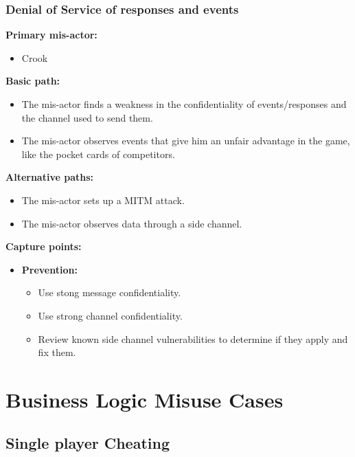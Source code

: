 \documentclass[a4paper,11pt]{report}
\begin{document}
\subsubsection{Denial of Service of responses and events}
\textbf{Primary mis-actor:}
\begin{itemize}
\item Crook
\end{itemize}
\textbf{Basic path:}
\begin{itemize}
\item The mis-actor finds a weakness in the confidentiality of events/responses and the channel used to send them.
\item The mis-actor observes events that give him an unfair advantage in the game, like the pocket cards of competitors. 
\end{itemize}
\textbf{Alternative paths:}
\begin{itemize}
\item The mis-actor sets up a MITM attack.
\item The mis-actor observes data through a side channel.
\end{itemize}
\textbf{Capture points:}
\begin{itemize}
\item \textbf{Prevention:}
\begin{itemize}
\item Use stong message confidentiality.
\item Use strong channel confidentiality.
\item Review known side channel vulnerabilities to determine if they apply and fix them.
\end{itemize}
\end{itemize}

\section{Business Logic Misuse Cases}
\subsection{Single player Cheating}
\end{document}

